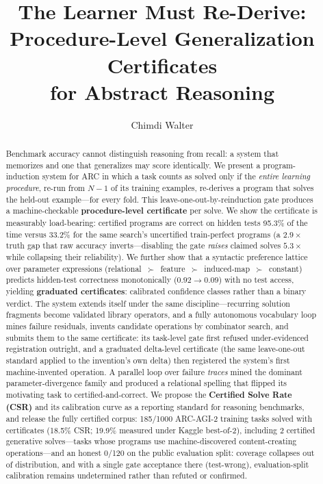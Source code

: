\documentclass[11pt]{article}
\title{The Learner Must Re-Derive:\\Procedure-Level Generalization Certificates\\for Abstract Reasoning}
\author{Chimdi Walter}
\date{}
\begin{document}
\maketitle

\begin{abstract}
Benchmark accuracy cannot distinguish reasoning from recall: a system that
memorizes and one that generalizes may score identically.  We present a
program-induction system for ARC in which a task counts as solved only if
the \emph{entire learning procedure}, re-run from $N{-}1$ of its training
examples, re-derives a program that solves the held-out example---for
every fold.  This leave-one-out-by-reinduction gate produces a
machine-checkable \textbf{procedure-level certificate} per solve.  We show
the certificate is measurably load-bearing: certified programs are correct
on hidden tests 95.3\% of the time versus 33.2\% for the same search's
uncertified train-perfect programs (a $2.9\times$ truth gap that raw
accuracy inverts---disabling the gate \emph{raises} claimed solves
$5.3\times$ while collapsing their reliability).  We further show that a
syntactic preference lattice over parameter expressions
(relational~$\succ$~feature~$\succ$~induced-map~$\succ$~constant) predicts
hidden-test correctness monotonically ($0.92 \to 0.09$) with no test
access, yielding \textbf{graduated certificates}: calibrated confidence
classes rather than a binary verdict.  The system extends itself under the
same discipline---recurring solution fragments become validated library
operators, and a fully autonomous vocabulary loop mines failure residuals,
invents candidate operations by combinator search, and submits them to the
same certificate: its task-level gate first refused under-evidenced
registration outright, and a graduated delta-level certificate (the same
leave-one-out standard applied to the invention's own delta) then
registered the system's first machine-invented operation.  A parallel loop
over failure \emph{traces} mined the dominant parameter-divergence family
and produced a relational spelling that flipped its motivating task to
certified-and-correct.  We propose the \textbf{Certified Solve Rate (CSR)}
and its calibration curve as a reporting standard for reasoning benchmarks,
and release the fully certified corpus: 185/1000 ARC-AGI-2 training tasks
solved with certificates (18.5\% CSR; 19.9\% measured under Kaggle
best-of-2), including 2 certified generative solves---tasks whose programs
use machine-discovered content-creating operations---and an honest 0/120 on
the public evaluation split: coverage collapses out of distribution, and
with a single gate acceptance there (test-wrong), evaluation-split
calibration remains undetermined rather than refuted or confirmed.
\end{abstract}
\end{document}
